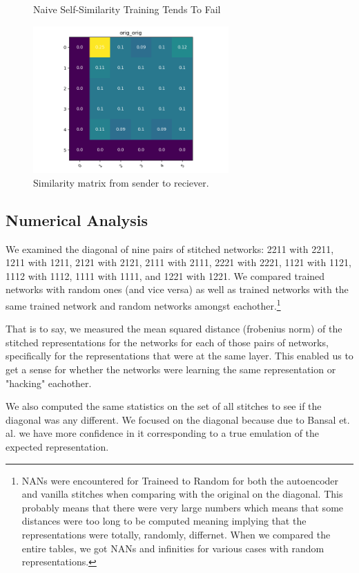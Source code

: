 \documentclass{article} %
\begin{document}
\begin{center}
   \begin{figure}[h!]
      \centering
      \caption{Naive Self-Similarity Training Tends To Fail}
      \includegraphics[width=7.5cm]{resnet1111_1111_autoencoder.png}
      \caption*{Similarity matrix from sender to reciever.}
   \end{figure}
\end{center}

\subsection*{Numerical Analysis}
We examined the diagonal of nine pairs of stitched networks: 2211 with 2211, 1211 with 1211, 
2121 with 2121, 2111 with 2111, 2221 with 2221, 1121 with 1121, 1112 with 1112, 1111 with 1111, 
and 1221 with 1221. We compared trained networks with random ones (and vice versa) as well as trained
networks with the same trained network and random networks amongst eachother.\footnote{NANs were encountered for 
Traineed to Random for both the autoencoder and vanilla stitches when comparing with the original on the diagonal.
This probably means  that there were
very large numbers which means that some distances were too long to be computed meaning implying that
the representations were totally, randomly, differnet. When we compared the entire tables, we got NANs and infinities
for various cases with random representations.}

That is to say, we measured the mean squared distance (frobenius norm) of the stitched representations for the networks
for each of those pairs of networks, specifically for the representations that were at the same layer. This enabled us
to get a sense for whether the networks were learning the same representation or "hacking" eachother.

We also computed the same statistics on the set of all stitches to see if the diagonal was any different. We focused
on the diagonal because due to Bansal et. al. we have more confidence in it corresponding to a true emulation of the
expected representation.
\end{document}
